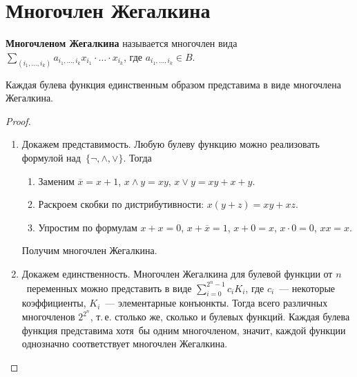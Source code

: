 \section{Многочлен Жегалкина}
 \textbf{Многочленом Жегалкина} называется многочлен вида
$\displaystyle \sum_{(i_1, \ldots, i_k)} a_{i_1, \ldots, i_k} x_{i_1} \cdot \ldots \cdot x_{i_k}$, где $a_{i_1, \ldots, i_k} \in B$.

\begin{theorem}[Жегалкина]
Каждая булева функция единственным образом представима в виде многочлена Жегалкина.
\end{theorem}
\begin{proof}
\begin{enumerate}
	\item Докажем представимость.
	Любую булеву функцию можно реализовать формулой над~$\{ \neg, \land, \lor \}$.
	Тогда
	\begin{enumerate}
		\item Заменим $\overline x = x + 1$, $x \land y = xy$, $x \lor y = xy + x + y$.
		\item Раскроем скобки по дистрибутивности: $x(y + z) = xy + xz$.
		\item Упростим по формулам $x + x = 0$, $x + \overline x = 1$, $x + 0 = x$, $x \cdot 0 = 0$, $xx = x$.
	\end{enumerate}
	
	Получим многочлен Жегалкина.
	
	\item Докажем единственность.
	Многочлен Жегалкина для булевой функции от $n$~переменных можно представить в виде $\displaystyle \sum_{i=0}^{2^n-1} c_i K_i$, где $c_i$~--- некоторые коэффициенты, $K_i$~--- элементарные конъюнкты.
	Тогда всего различных многочленов $2^{2^n}$, т.\,е. столько же, сколько и булевых функций.
	Каждая булева функция представима хотя~бы одним многочленом, значит, каждой функции однозначно соответствует многочлен Жегалкина.
\end{enumerate}
\end{proof}

